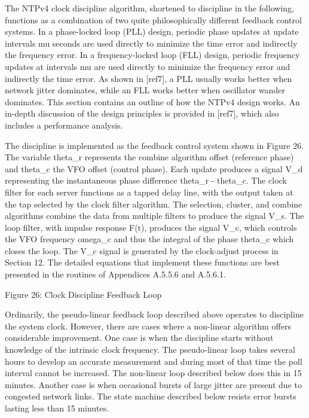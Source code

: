 The NTPv4 clock discipline algorithm, shortened to discipline in the
following, functions as a combination of two quite philosophically
different feedback control systems.  In a phase-locked loop (PLL)
design, periodic phase updates at update intervals mu seconds are
used directly to minimize the time error and indirectly the frequency
error.  In a frequency-locked loop (FLL) design, periodic frequency
updates at intervals mu are used directly to minimize the frequency
error and indirectly the time error.  As shown in [ref7], a PLL
usually works better when network jitter dominates, while an FLL
works better when oscillator wander dominates.  This section contains
an outline of how the NTPv4 design works.  An in-depth discussion of
the design principles is provided in [ref7], which also includes a
performance analysis.

The discipline is implemented as the feedback control system shown in
Figure 26.  The variable theta\_r represents the combine algorithm
offset (reference phase) and theta\_c the VFO offset (control phase).
Each update produces a signal V\_d representing the instantaneous
phase difference theta\_r - theta\_c.  The clock filter for each server
functions as a tapped delay line, with the output taken at the tap
selected by the clock filter algorithm.  The selection, cluster, and
combine algorithms combine the data from multiple filters to produce
the signal V\_s.  The loop filter, with impulse response F(t),
produces the signal V\_c, which controls the VFO frequency omega\_c and
thus the integral of the phase theta\_c which closes the loop.  The
V\_c signal is generated by the clock-adjust process in Section 12.
The detailed equations that implement these functions are best
presented in the routines of Appendices A.5.5.6 and A.5.6.1.


              Figure 26: Clock Discipline Feedback Loop

Ordinarily, the pseudo-linear feedback loop described above operates
to discipline the system clock.  However, there are cases where a
non-linear algorithm offers considerable improvement.  One case is
when the discipline starts without knowledge of the intrinsic clock
frequency.  The pseudo-linear loop takes several hours to develop an
accurate measurement and during most of that time the poll interval
cannot be increased.  The non-linear loop described below does this
in 15 minutes.  Another case is when occasional bursts of large
jitter are present due to congested network links.  The state machine
described below resists error bursts lasting less than 15 minutes.

